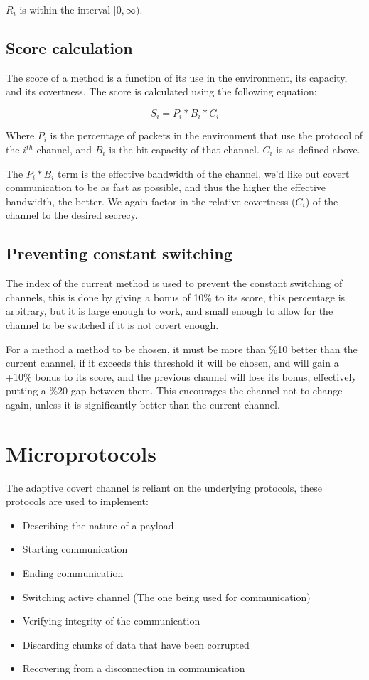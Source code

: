 $R_i$ is within the interval $[0, \infty)$.

\subsection{Score calculation}

The score of a method is a function of its use in the environment, its capacity, and its covertness.
The score is calculated using the following equation:

\begin{equation}
    S_i = P_i * B_i * C_i
\end{equation}

Where $P_i$ is the percentage of packets in the environment that use the protocol of the $i^{th}$ channel, and $B_i$ is the bit capacity of that channel. $C_i$ is as defined above.

The $P_i * B_i$ term is the effective bandwidth of the channel, we'd like out covert communication to be as fast as possible, and thus the higher the effective bandwidth, the better. We again factor in the relative covertness ($C_i$) of the channel to the desired secrecy.

\subsection{Preventing constant switching}

The index of the current method is used to prevent the constant switching of channels, this is done by giving a bonus of 10\% to its score, this percentage is arbitrary, but it is large enough to work, and small enough to allow for the channel to be switched if it is not covert enough.

For a method a method to be chosen, it must be more than \%10 better than the current channel, if it exceeds this threshold it will be chosen, and will gain a +10\% bonus to its score, and the previous channel will lose its bonus, effectively putting a \%20 gap between them. This encourages the channel not to change again, unless it is significantly better than the current channel.

\section{Microprotocols}
\label{sec:microprotocols}

The adaptive covert channel is reliant on the underlying protocols, these protocols are used to implement:
\begin{itemize}
    \item Describing the nature of a payload
    \item Starting communication
    \item Ending communication
    \item Switching active channel (The one being used for communication)
    \item Verifying integrity of the communication
    \item Discarding chunks of data that have been corrupted
    \item Recovering from a disconnection in communication
\end{itemize}
\label{itm:microprotocols}

